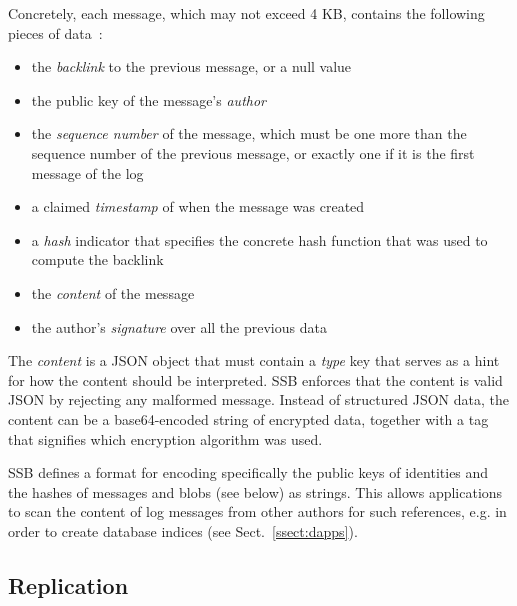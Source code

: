 \documentclass[9pt,sigconf]{acmart}
\begin{document}
Concretely, each message, which may not exceed 4 KB, contains the following pieces of data~\cite{ssb-spec-messages}:

\begin{itemize}

\item the {\em backlink} to the previous message, or a null value

\item the public key of the message's {\em author}

\item the {\em sequence number} of the message, which must be one more than the sequence number of the previous message, or exactly one if it is the first message of the log

\item a claimed {\em timestamp} of when the message was created

\item a {\em hash} indicator that specifies the concrete hash function that was used to compute the backlink

\item the {\em content} of the message

\item the author's {\em signature} over all the previous data

\end{itemize}

The {\em content} is a JSON object that must contain a {\em type} key that serves as a hint for how the content should be interpreted. SSB enforces that the content is valid JSON by rejecting any malformed message.
Instead of structured JSON data, the content can be a base64-encoded string of encrypted data, together with a tag that signifies which encryption algorithm was used.

SSB defines a format for encoding specifically the public keys of identities and the hashes of messages and blobs (see below) as strings. This allows applications to scan the content of log messages from other authors for such references, e.g. in order to create database indices (see Sect.~\ref{ssect:dapps}).


\subsection*{Replication}
\end{document}

